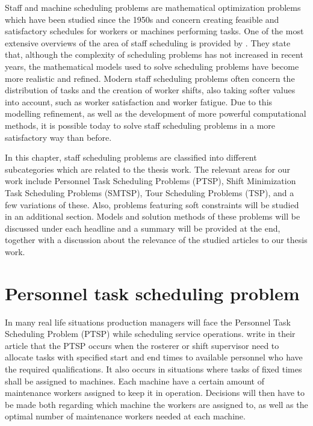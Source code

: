 
Staff and machine scheduling problems are mathematical optimization problems which have been studied since the 1950s and concern creating feasible and satisfactory schedules for workers or machines performing tasks. One of the most extensive overviews of the area of staff scheduling is provided by \citet{ernst_2004}. They state that, although the complexity of scheduling problems has not increased in recent years, the mathematical models used to solve scheduling problems have become more realistic and refined. Modern staff scheduling problems often concern the distribution of tasks and the creation of worker shifts, also taking softer values into account, such as worker satisfaction and worker fatigue. Due to this modelling refinement, as well as the development of more powerful computational methods, it is possible today to solve staff scheduling problems in a more satisfactory way than before.

In this chapter, staff scheduling problems are classified into different subcategories which are related to the thesis work. The relevant areas for our work include Personnel Task Scheduling Problems (PTSP), Shift Minimization Task Scheduling Problems (SMTSP), Tour Scheduling Problems (TSP), and a few variations of these. Also, problems featuring soft constraints will be studied in an additional section. Models and solution methods of these problems will be discussed under each headline and a summary will be provided at the end, together with a discussion about the relevance of the studied articles to our thesis work.


\section{Personnel task scheduling problem} \label{PTSP}

In many real life situations production managers will face the Personnel Task Scheduling Problem (PTSP) while scheduling service operations. \citet{krishnamoorthy_2001} write in their article that the PTSP occurs when the rosterer or shift supervisor need to allocate tasks with specified start and end times to available personnel who have the required qualifications. It also occurs in situations where tasks of fixed times shall be assigned to machines. Each machine have a certain amount of maintenance workers assigned to keep it in operation. Decisions will then have to be made both regarding which machine the workers are assigned to, as well as the optimal number of maintenance workers needed at each machine.

